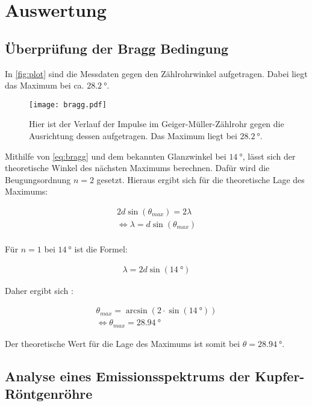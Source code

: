 \section{Auswertung}
\label{sec:Auswertung}

\subsection{Überprüfung der Bragg Bedingung}
In \autoref{fig:plot} sind die Messdaten gegen den Zählrohrwinkel aufgetragen.
Dabei liegt das Maximum bei ca. $\SI{28.2}{\degree}$.

\begin{figure}
  \centering
  \texttt{[image: bragg.pdf]}
  \caption{Hier ist der Verlauf der Impulse im Geiger-Müller-Zählrohr gegen die Ausrichtung dessen aufgetragen. Das Maximum liegt bei $\SI{28.2}{\degree}$.}
  \label{fig:plot}
\end{figure}

Mithilfe von \autoref{eq:bragg} und dem bekannten Glanzwinkel bei $\SI{14}{\degree}$, lässt sich der theoretische Winkel des nächsten Maximums berechnen.
Dafür wird die Beugungsordnung $n = 2$ gesetzt.
\newpage
Hieraus ergibt sich für die theoretische Lage des Maximums:

\begin{align*}
  2d\sin\left(\theta_{max}\right) = 2\lambda\\
  \Leftrightarrow \lambda = d\sin\left(\theta_{max}\right)\\
\end{align*}

Für $n = 1$ bei $\SI{14}{\degree}$ ist die Formel:

\begin{align*}
  \lambda= 2d\sin\left(\SI{14}{\degree}\right)
\end{align*}

Daher ergibt sich :

\begin{align*}
  \theta_{max} = \arcsin\left(2\cdot \sin\left(\SI{14}{\degree}\right)\right)\\
  \Leftrightarrow \theta_{max} = \SI{28.94}{\degree}
\end{align*}

Der theoretische Wert für die Lage des Maximums ist somit bei $\theta = \SI{28.94}{\degree}$.

\subsection{Analyse eines Emissionsspektrums der Kupfer-Röntgenröhre}

